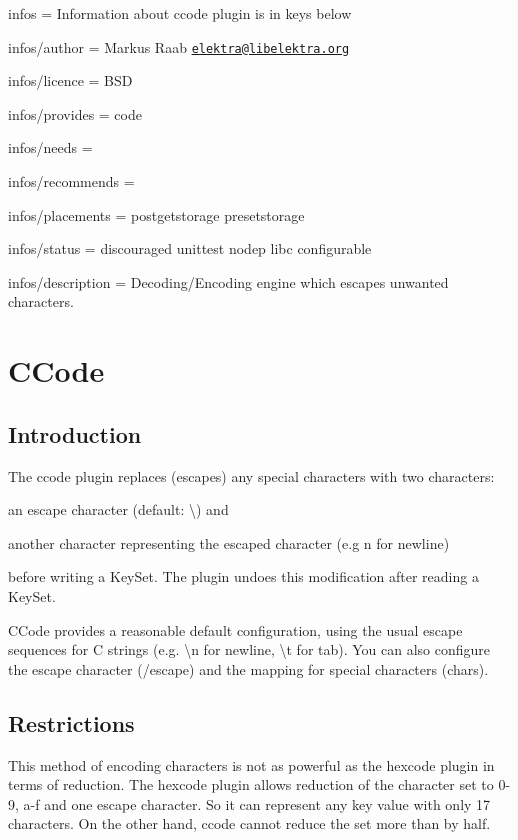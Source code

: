 
\begin{DoxyItemize}
\item infos = Information about ccode plugin is in keys below
\item infos/author = Markus Raab \href{mailto:elektra@libelektra.org}{\tt elektra@libelektra.\+org}
\item infos/licence = B\+SD
\item infos/provides = code
\item infos/needs =
\item infos/recommends =
\item infos/placements = postgetstorage presetstorage
\item infos/status = discouraged unittest nodep libc configurable
\item infos/description = Decoding/\+Encoding engine which escapes unwanted characters.
\end{DoxyItemize}\hypertarget{autotoc_md79_src_plugins_ccode_README_md}{}\section{C\+Code}\label{autotoc_md79_src_plugins_ccode_README_md}
\hypertarget{autotoc_md79_autotoc_md80}{}\subsection{Introduction}\label{autotoc_md79_autotoc_md80}
The {\ttfamily ccode} plugin replaces (escapes) any special characters with two characters\+:


\begin{DoxyItemize}
\item an escape character (default\+: {\ttfamily \textbackslash{}}) and
\item another character representing the escaped character (e.\+g {\ttfamily n} for newline)
\end{DoxyItemize}

before writing a {\ttfamily Key\+Set}. The plugin undoes this modification after reading a {\ttfamily Key\+Set}.

C\+Code provides a reasonable default configuration, using the usual escape sequences for C strings (e.\+g. {\ttfamily \textbackslash{}n} for newline, {\ttfamily \textbackslash{}t} for tab). You can also configure the escape character ({\ttfamily /escape}) and the mapping for special characters ({\ttfamily chars}).\hypertarget{autotoc_md79_autotoc_md81}{}\subsection{Restrictions}\label{autotoc_md79_autotoc_md81}
This method of encoding characters is not as powerful as the hexcode plugin in terms of reduction. The hexcode plugin allows reduction of the character set to \textquotesingle{}0\textquotesingle{}-\/\textquotesingle{}9\textquotesingle{}, \textquotesingle{}a\textquotesingle{}-\/\textquotesingle{}f\textquotesingle{} and one escape character. So it can represent any key value with only 17 characters. On the other hand, ccode cannot reduce the set more than by half.

